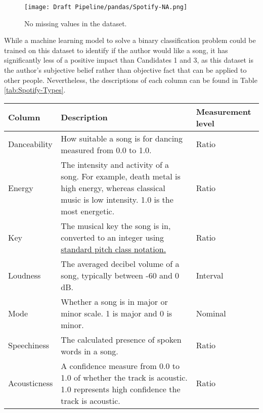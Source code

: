 \begin{figure}[H]
    \centering
    \texttt{[image: Draft Pipeline/pandas/Spotify-NA.png]}
    \caption{No missing values in the dataset.}
    \label{fig:Spotify-NA}
\end{figure}

While a machine learning model to solve a binary classification problem could be trained on this dataset to identify if the author would like a song, 
it has significantly less of a positive impact than Candidates 1 and 3, as this dataset is the author's subjective belief rather than objective
fact that can be applied to other people. Nevertheless, the descriptions of each column can be found in Table \ref{tab:Spotify-Types}.

\begin{table}[H]
    \centering
    \begin{tabular}{ |p{}| p{}| p{}|}
        \hline
        \cellcolor{blue!25}Column & \cellcolor{blue!25}Description & \cellcolor{blue!25}Measurement level\\
            \hline
            Danceability & How suitable a song is for dancing measured from 0.0 to 1.0.
            & Ratio \\
            \hline
            Energy & The intensity and activity of a song. For example, death metal is high energy, whereas classical music is low intensity. 1.0 is the most energetic.
            & Ratio\\
            \hline
            Key & The musical key the song is in, converted to an integer using \href{https://smbutterfield.github.io/ibmt17-18/22-intro-to-non-diatonic-materials/b2-tx-pcintnotation.html}{standard pitch class notation.}\autocite{butterfield_22b_nodate} 
            & Ratio\\
            \hline
            Loudness & The averaged decibel volume of a song, typically between -60 and 0 dB.
            & Interval\\
            \hline
            Mode & Whether a song is in major or minor scale. 1 is major and 0 is minor.
            & Nominal\\
            \hline
            Speechiness & The calculated presence of spoken words in a song.
            & Ratio\\
            \hline
            Acousticness & A confidence measure from 0.0 to 1.0 of whether the track is acoustic. 1.0 represents high confidence the track is acoustic.
            & Ratio\\

\end{tabular}
\end{table}
